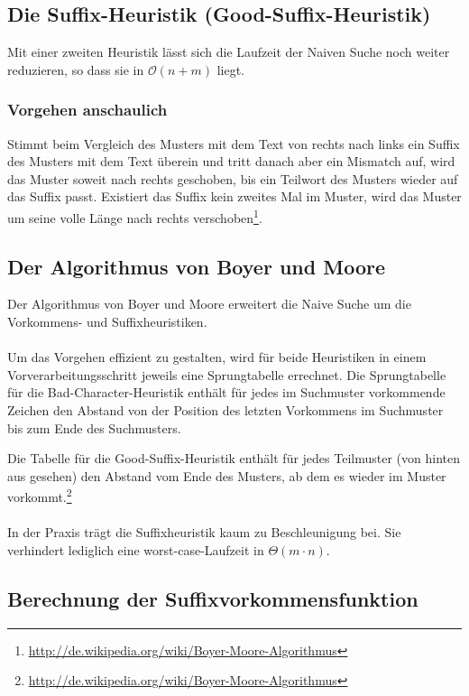 \subsection{Die Suffix-Heuristik (Good-Suffix-Heuristik)}
Mit einer zweiten Heuristik lässt sich die Laufzeit der Naiven Suche noch weiter reduzieren, so dass sie in \(\mathcal{O}(n+m)\) liegt.

\subsubsection{Vorgehen anschaulich}
Stimmt beim Vergleich des Musters mit dem Text von rechts nach links ein Suffix des Musters mit dem Text überein und tritt danach aber ein Mismatch auf, wird das Muster soweit nach rechts geschoben, bis ein Teilwort des Musters wieder auf das Suffix passt. Existiert das Suffix kein zweites Mal im Muster, wird das Muster um seine volle Länge nach rechts verschoben\footnote{\url{http://de.wikipedia.org/wiki/Boyer-Moore-Algorithmus}}.


\subsection{Der Algorithmus von Boyer und Moore}
Der Algorithmus von Boyer und Moore erweitert die Naive Suche um die Vorkommens- und Suffixheuristiken.
\\\\
Um das Vorgehen effizient zu gestalten, wird für beide Heuristiken in einem Vorverarbeitungsschritt jeweils eine Sprungtabelle errechnet. Die Sprungtabelle für die Bad-Character-Heuristik enthält für jedes im Suchmuster vorkommende Zeichen den Abstand von der Position des letzten Vorkommens im Suchmuster bis zum Ende des Suchmusters.

Die Tabelle für die Good-Suffix-Heuristik enthält für jedes Teilmuster (von hinten aus gesehen) den Abstand vom Ende des Musters, ab dem es wieder im Muster vorkommt.\footnote{\url{http://de.wikipedia.org/wiki/Boyer-Moore-Algorithmus}}
\\\\

In der Praxis trägt die Suffixheuristik kaum zu Beschleunigung bei. Sie verhindert lediglich eine worst-case-Laufzeit in \(\Theta(m\cdot n)\).


\subsection{Berechnung der Suffixvorkommensfunktion}

